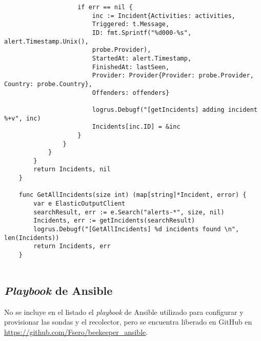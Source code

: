 \begin{verbatim}
                    if err == nil {
                        inc := Incident{Activities: activities, 
                        Triggered: t.Message,
                        ID: fmt.Sprintf("%d000-%s", alert.Timestamp.Unix(), 
                        probe.Provider),
                        StartedAt: alert.Timestamp,
                        FinishedAt: lastSeen, 
                        Provider: Provider{Provider: probe.Provider, Country: probe.Country},
                        Offenders: offenders}

                        logrus.Debugf("[getIncidents] adding incident %+v", inc)
                        Incidents[inc.ID] = &inc
                    }
                }
            }
        }
        return Incidents, nil
    }
    
    func GetAllIncidents(size int) (map[string]*Incident, error) {
        var e ElasticOutputClient
        searchResult, err := e.Search("alerts-*", size, nil)
        Incidents, err := getIncidents(searchResult)
        logrus.Debugf("[GetAllIncidents] %d incidents found \n", len(Incidents))
        return Incidents, err
    }
    

\end{verbatim}
    
\subsection{\emph{Playbook} de Ansible}
\label{subsec:playbook-ansible}

No se incluye en el listado el \emph{playbook} de Ansible utilizado para configurar y provisionar las sondas y el recolector, pero se encuentra liberado en GitHub
en \href{https://github.com/Fsero/beekeeper\_ansible}{https://github.com/Fsero/beekeeper\_ansible}.


